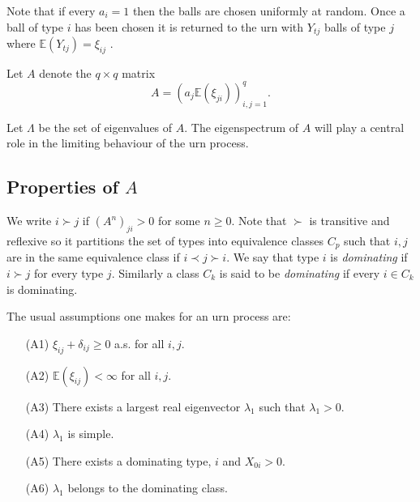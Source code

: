 \documentclass[12pt]{article} %
\theoremstyle{definition}
\begin{document}
Note that if every $a_{i} = 1$ then the balls are chosen uniformly at random.  Once a ball of type $i$ has been chosen it is                                                                                                                                                                                                                                                                                                                                                                                                                                                                                                                                                                                                                                                                                                                                             returned to the urn with $Y_{tj}$ balls of type $j$ where $\mathbb{E}(Y_{tj})= \xi_{ij}$ \cite{JansonSPATA}.
 
Let $A$ denote the $q \times q$ matrix
\[A = \left(a_{j}\mathbb{E}(\xi_{ji})\right)^{q}_{i,j = 1}.\]

Let $\Lambda$ be the set of eigenvalues of $A$. The eigenspectrum of $A$ will play a central role in the limiting behaviour of the urn process.  
\subsection{Properties of $A$}
 
 We write $i\succ j$ if $(A^{n})_{ji} > 0 $ for some $n \geq 0$.  Note that $\succ$ is transitive and reflexive so it partitions the set of types into equivalence classes $C_{p}$ such that $i,j$ are in the same equivalence class if $i\prec j \succ i$.  We say that type $i$ is \emph{dominating} if $i \succ j$ for every type $j$.  Similarly a class $C_{k}$ is said to be \emph{dominating} if every $i \in C_{k}$ is dominating.   

The usual assumptions one makes for an urn process are:
\begin{itemize}
 \item[(A1)] $\xi_{ij} + \delta_{ij} \geq 0$ a.s. for all $i,j$.
 \item[(A2)] $\mathbb{E}(\xi_{ij}) < \infty$ for all $i,j$.
 \item[(A3)] There exists a largest real eigenvector $\lambda_{1}$ such that $\lambda_{1} >0$.
 \item[(A4)] $\lambda_{1}$ is simple.
 \item[(A5)] There exists a dominating type, $i$ and $X_{0i} >0$.
 \item[(A6)] $\lambda_{1}$ belongs to the dominating class.
 \end{itemize}
\end{document}

